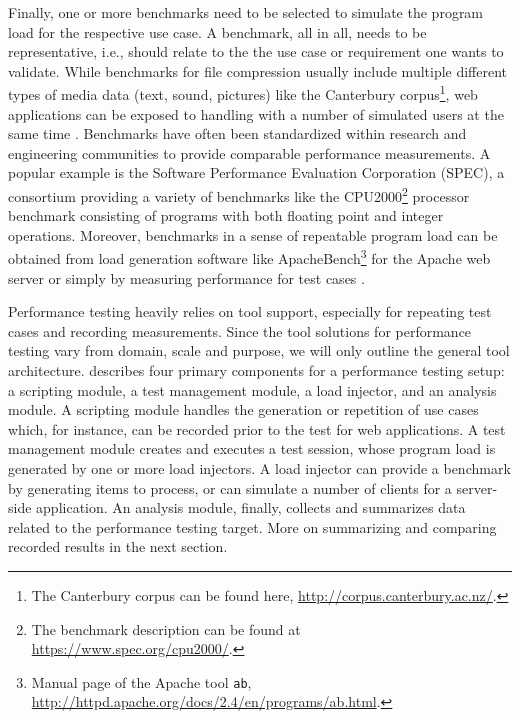 Finally, one or more benchmarks need to be selected to simulate  the program
load for the respective use case. A benchmark, all in all, needs to be
representative, i.e., should relate to the the use case or requirement one
 wants to validate. While benchmarks for file compression usually include
multiple different types of media data (text, sound, pictures) like the
Canterbury corpus\footnote{The Canterbury corpus can be found
here, \url{http://corpus.canterbury.ac.nz/}.}, web applications can be exposed
to handling with a number of simulated users at the same time
\citep{molyneaux_art_2014}. Benchmarks have often been standardized within research and engineering communities to provide comparable performance measurements. A popular example is the Software Performance Evaluation
Corporation (SPEC), a consortium providing a variety of benchmarks like the
CPU2000\footnote{The benchmark description
can be found at \url{https://www.spec.org/cpu2000/}.} processor benchmark
consisting of programs with both floating point and integer operations.
Moreover, benchmarks in a sense of repeatable program load can be obtained from
load generation software like ApacheBench\footnote{Manual page of the Apache
tool \texttt{ab}, \url{http://httpd.apache.org/docs/2.4/en/programs/ab.html}.}
for the Apache web server or simply by measuring performance for test cases
\citep{heger_automated_2013,nguyen_industrial_2014}.

Performance testing heavily relies on tool support, especially for repeating
test cases and recording measurements. Since the
tool solutions for performance testing vary from domain, scale and purpose, we
will only outline the general tool architecture. \cite{molyneaux_art_2014} describes
four primary components for a performance testing setup: a scripting module, a
test management module, a load injector, and an analysis module. A scripting module handles the generation or
repetition of use cases which, for instance, can be recorded prior to the test
for web applications. A test management module creates and executes a test
session, whose program load is generated by one or more load injectors. A load
injector can provide a benchmark by generating items to process, or can simulate
a number of clients for a server-side application. An analysis module, finally,
collects and summarizes data related to the performance testing target. More on
summarizing and comparing recorded results in the next section.

